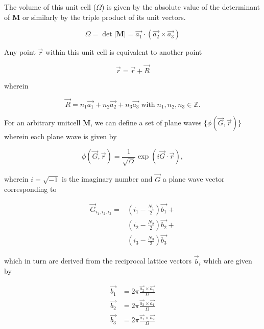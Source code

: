 The volume of this unit cell ($\Omega$) is given by the absolute value of the determinant of $\mathbf{M}$ or similarly by the triple product of its unit vectors.

\begin{equation}
    \Omega = \det \left| \mathbf{M} \right| = \vec{a_{1}} \cdot \left(\vec{a_{2}} \times \vec{a_{3}} \right)
\end{equation}

Any point $\vec{r}$ within this unit cell is equivalent to another point 

\begin{equation}
    \vec{r} = \vec{r} + \vec{R}
\end{equation}

wherein

\begin{equation}
    \vec{R} = n_{1}\vec{a_{1}} + n_{2}\vec{a_{2}} + n_{3}\vec{a_{3}} \; \text{with} \; n_{1},n_{2},n_{3} \in \mathbb{Z}.
\end{equation}

For an arbitrary unitcell $\mathbf{M}$, we can define a set of plane waves $\{ \phi(\vec{G},\vec{r}) \}$ wherein each plane wave is given by

\begin{equation}
    \phi(\vec{G},\vec{r}) = \frac{1}{\sqrt{\Omega}} \exp \left(i \vec{G} \cdot \vec{r} \right),
    \label{eq:pwexpr}
\end{equation}

wherein $i = \sqrt{-1}$ is the imaginary number and $\vec{G}$ a plane wave vector corresponding to

\begin{align}
    \vec{G}_{i_{1},i_{2},i_{3}} = 
    &\left(i_{1} - \frac{N_{1}}{2} \right)\vec{b_{1}} + \label{eq:gvectors} \\ \nonumber
    &\left(i_{2} - \frac{N_{2}}{2} \right)\vec{b_{2}} + \\ \nonumber
    &\left(i_{3} - \frac{N_{3}}{2} \right)\vec{b_{3}}
\end{align}

which in turn are derived from the reciprocal lattice vectors $\vec{b}_{i}$ which are given by

\begin{align}
    \vec{b_{1}} &= 2 \pi \frac{\vec{a_{2}} \times \vec{a_{3}}}{\Omega} \label{eq:reciproc-latv1} \\ 
    \vec{b_{2}} &= 2 \pi \frac{\vec{a_{3}} \times \vec{a_{1}}}{\Omega} \label{eq:reciproc-latv2} \\ 
    \vec{b_{3}} &= 2 \pi \frac{\vec{a_{1}} \times \vec{a_{2}}}{\Omega} \label{eq:reciproc-latv3}
\end{align}

